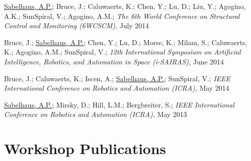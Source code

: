 \documentclass[letterpaper]{deedy-resume} %
\begin{document}
\begin{etaremune}
\item {} \underline{Sabelhaus, A.P.}; Bruce, J.; Caluwaerts, K.; Chen, Y.; Lu, D.; Liu, Y.; Agogino, A.K.; SunSpiral, V.; Agogino, A.M.; {\it The 6th World Conference on Structural Control and Monitoring (6WCSCM),} July 2014

\item {} Bruce, J.; \underline{Sabelhaus, A.P.}; Chen, Y.; Lu, D.; Morse, K.; Milam, S.; Caluwaerts, K.; Agogino, A.M.; SunSpiral, V.; {\it 12th International Symposium on Artificial Intelligence, Robotics, and Automation in Space (i-SAIRAS),} June 2014

\item {} Bruce, J.; Caluwaerts, K.; Iscen, A.; \underline{Sabelhaus, A.P.}; SunSpiral, V.; {\it IEEE International Conference on Robotics and Automation (ICRA),} May 2014

\item {} \underline{Sabelhaus, A.P.}; Mirsky, D.; Hill, L.M.; Bergbreiter, S.; {\it IEEE International Conference on Robotics and Automation (ICRA),} May 2013


\end{etaremune}








\section{Workshop Publications}
\end{document}
